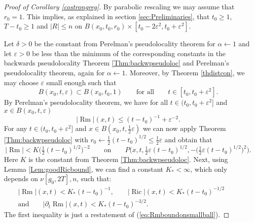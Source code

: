 \documentclass[11pt]{amsart}
\numberwithin{equation}{section}
\def\eps{\varepsilon}
\def\eps{\varepsilon}
\DeclareMathOperator{\Ric}{Ric}
\DeclareMathOperator{\Rm}{Rm}
\numberwithin{equation}{section}
\begin{document}
\begin{proof}[Proof of Corollary \ref{costrongreg}]
By parabolic rescaling we may assume that $r_0 = 1$.
This implies, as explained in section \ref{sec:Preliminaries}, that $t_0 \geq 1$, $T - t_0 \geq 1$ and $|R| \leq n$ on $B(x_0, t_0, r_0) \times [t_0 - 2 \varepsilon^2, t_0 + \varepsilon^2]$.

Let $\delta > 0$ be the constant from Perelman's pseudolocality theorem \cite[Theorem 10.1]{P:1} for $\alpha \leftarrow 1$ and let $\eps > 0$ be less than the minimum of the corresponding constants in the backwards pseudolocality Theorem \ref{Thm:backwpseudoloc} and Perelman's pseudolocality theorem, again for $\alpha \leftarrow 1$.
Moreover, by Theorem \ref{thdistcon}, we may choose $\varepsilon$ small enough such that
\[ B(x_0, t, \varepsilon) \subset B(x_0, t_0, 1) \qquad \text{for all} \qquad t \in [t_0, t_0 + \varepsilon^2]. \]
By Perelman's pseudolocality theorem, we have for all $t \in (t_0, t_0 + \eps^2]$ and $x \in B( x_0, t, \eps )$
\[ |{\Rm}|(x,t) \leq (t-t_0)^{-1} + \eps^{-2}. \]
For any $t \in (t_0, t_0 +  \eps^2]$ and $x \in B(x_0, t, \frac12 \eps )$ we can now apply Theorem \ref{Thm:backwpseudoloc} with $r_0 \leftarrow \frac12 (t - t_0)^{1/2} \leq \frac12 \eps$ and obtain that
\begin{equation} \label{eq:Rmboundonsmallball}
 |{\Rm}| < K \big( \tfrac12 (t - t_0)^{1/2} \big)^{-2} \qquad \text{on} \qquad 
 P\big( x,t, \tfrac12 \eps (t - t_0)^{1/2}, - \big(\tfrac12 \eps  (t - t_0)^{1/2} \big)^2 \big).
\end{equation}
Here $K$ is the constant from Theorem \ref{Thm:backwpseudoloc}.
Next, using Lemma \ref{Lem:goodRicbound}, we can find a constant $K_* < \infty$, which only depends on $\nu[g_0, 2T], n$, such that:
\begin{multline} \label{eq:RicanddtRm}
|{\Rm}| (x,t) < K_* (t-t_0)^{-1}, \qquad |{\Ric}|(x,t) < K_* (t-t_0)^{-1/2} \qquad \\ \text{and} \qquad |\partial_t {\Rm} |(x,t) < K_* (t-t_0)^{-3/2}.
\end{multline}
The first inequality is just a restatement of (\ref{eq:Rmboundonsmallball}).


\end{proof}
\end{document}
